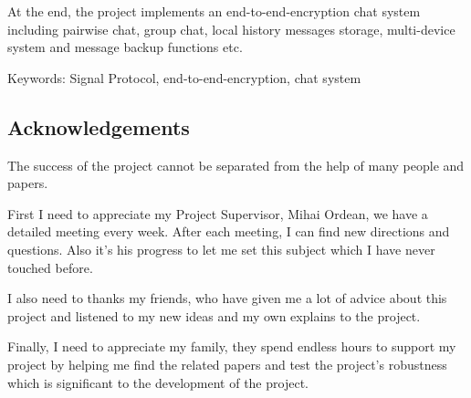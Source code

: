 At the end, the project implements an end-to-end-encryption chat system including pairwise chat, group chat, local history messages storage, multi-device system and message backup functions etc.

Keywords: Signal Protocol, end-to-end-encryption, chat system

\subsection{Acknowledgements}
The success of the project cannot be separated from the help of many people and papers.

First I need to appreciate my Project Supervisor, Mihai Ordean, we have a detailed meeting every week. After each meeting, I can find new directions and questions. Also it's his progress to let me set this subject which I have never touched before.

I also need to thanks my friends, who have given me a lot of advice about this project and listened to my new ideas and my own explains to the project.

Finally, I need to appreciate my family, they spend endless hours to support my project by helping me find the related papers and test the project's robustness which is significant to the development of the project.

\clearpage